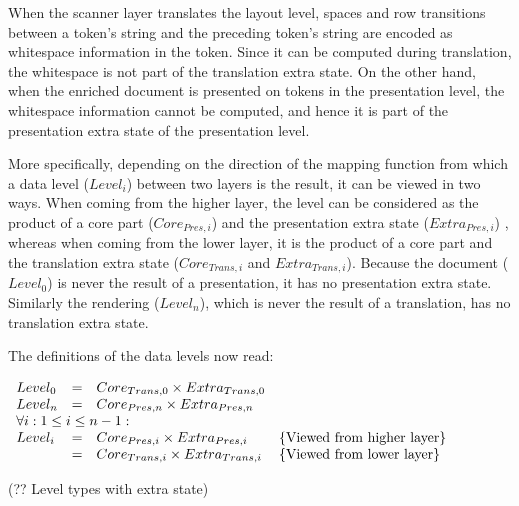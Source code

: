 \bc
When the scanner layer translates the layout level, spaces and row transitions between a token's string and the preceding token's string are encoded as whitespace information in the token. Since it can be computed during translation, the whitespace is not part of the translation extra state. On the other hand, when the enriched document is presented on tokens in the presentation level, the whitespace information cannot be computed, and hence it is part of the presentation extra state of the presentation level.
\ec


More specifically, depending on the direction of the mapping function from which a data level ($Level_{i}$) between two layers is the result, it can be viewed in two ways. When coming from the higher layer, the level can be considered as the product of a core part ($Core_{Pres,i}$) and the presentation extra state ($Extra_{Pres,i}$) , whereas when coming from the lower layer, it is the product of a core part and the translation extra state ($Core_{Trans,i}$ and $Extra_{Trans,i}$). Because the document ($Level_0$) is never the result of a presentation, it has no presentation extra state. Similarly the rendering ($Level_n$), which is never the result of a translation, has no translation extra state.

The definitions of the data levels now read:

\begin{small}\(\begin{array}{lcll}
Level_{0} & = & Core_{Trans,0} \times Extra_{Trans,0}\\
Level_{n} & = & Core_{Pres,n} \times Extra_{Pres,n}\\
\lefteqn{\forall i:1 \le i \le n-1:}  \\
Level_{i}  & = & Core_{Pres,i} \times Extra_{Pres,i}     & \text{\{Viewed from higher layer\}}\\
                & = & Core_{Trans,i} \times Extra_{Trans,i} &  \text{\{Viewed from lower layer\}}\\
\end{array}\)\end{small}
\begin{center}(?? Level types with extra state)\end{center}\vspace{1em}

